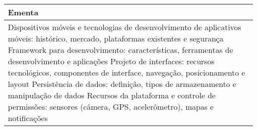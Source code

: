 \begin{quadro}[ht!]
\begin{tabular}{|p{3cm} p{2cm} p{3cm} p{2cm} p{3cm} p{2cm}|}
\multicolumn{6}{|p{15cm}|}{\cellcolor{blue1} Ementa} \\\hline
\hline\multicolumn{6}{|p{15cm}|}{\scriptsize Dispositivos móveis e tecnologias de desenvolvimento de aplicativos móveis: histórico, mercado, plataformas existentes e segurança Framework para desenvolvimento: características, ferramentas de desenvolvimento e aplicações Projeto de interfaces: recursos tecnológicos, componentes de interface, navegação, posicionamento e layout Persistência de dados: definição, tipos de armazenamento e manipulação de dados Recursos da plataforma e controle de permissões: sensores (câmera, GPS, acelerômetro), mapas e notificações}\\\hline 
\hline
	\end{tabular}
\end{quadro}


